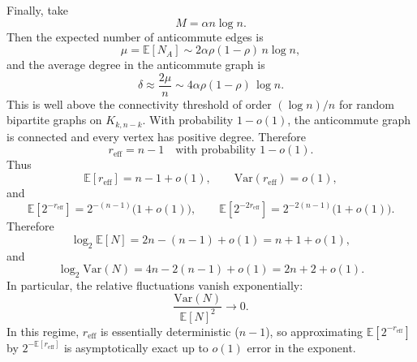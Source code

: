 \documentclass[a4paper,onecolumn,notitlepage,nofootinbib,longbibliography,superscriptaddress, floatfix, pra, aps, 10pt]{revtex4-2}
\begin{document}
Finally, take
\begin{equation}
  M = \alpha n\log n.
\end{equation}
Then the expected number of anticommute edges is
\begin{equation}
  \mu = \mathbb{E}[N_A] \sim 2\alpha\rho(1-\rho)\,n\log n,
\end{equation}
and the average degree in the anticommute graph is
\begin{equation}
  \delta \approx \frac{2\mu}{n}
  \sim 4\alpha\rho(1-\rho)\,\log n.
\end{equation}
This is well above the connectivity threshold of order $(\log n)/n$ for random bipartite graphs on $K_{k,n-k}$. With probability $1-o(1)$, the anticommute graph is connected and every vertex has positive degree. Therefore
\begin{equation}
  r_{\mathrm{eff}} = n-1 \quad\text{with probability }1-o(1).
\end{equation}
Thus
\begin{equation}
  \mathbb{E}[r_{\mathrm{eff}}] = n-1 + o(1),\qquad
  \mathrm{Var}(r_{\mathrm{eff}}) = o(1),
\end{equation}
and
\begin{equation}
  \mathbb{E}[2^{-r_{\mathrm{eff}}}] = 2^{-(n-1)}\big(1+o(1)\big),\qquad
  \mathbb{E}[2^{-2r_{\mathrm{eff}}}] = 2^{-2(n-1)}\big(1+o(1)\big).
\end{equation}
Therefore
\begin{equation}
  \log_2\mathbb{E}[N]
  = 2n - (n-1) + o(1) = n+1 + o(1),
\end{equation}
and
\begin{equation}
  \log_2\mathrm{Var}(N)
  = 4n - 2(n-1) + o(1) = 2n+2 + o(1).
\end{equation}
In particular, the relative fluctuations vanish exponentially:
\begin{equation}
  \frac{\mathrm{Var}(N)}{\mathbb{E}[N]^2} \to 0.
\end{equation}
In this regime, $r_{\mathrm{eff}}$ is essentially deterministic ($n-1$), so approximating $\mathbb{E}[2^{-r_{\mathrm{eff}}}]$ by $2^{-\mathbb{E}[r_{\mathrm{eff}}]}$ is asymptotically exact up to $o(1)$ error in the exponent.
\end{document}
